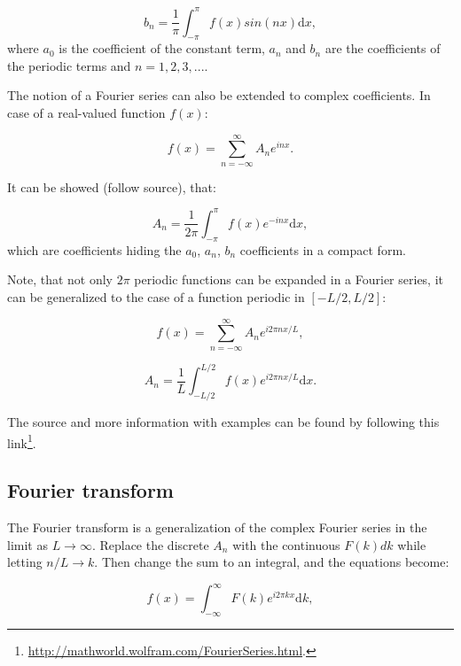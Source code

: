 \documentclass[12pt]{article}
\theoremstyle{plain}
\begin{document}
\begin{equation}
b_n = \frac{1}{\pi} \int_{-\pi}^{\pi} f(x) sin(nx) \text{d}x,
\end{equation}
where $a_0$ is the coefficient of the constant term, $a_n$ and $b_n$ are the coefficients of the periodic terms and $n=1,2,3, ...$.

The notion of a Fourier series can also be extended to complex coefficients. In case of a real-valued function $f(x)$:

\begin{equation}
f(x) = \sum_{n=-\infty}^{\infty} A_n e^{i n x}.
\end{equation}

It can be showed (follow source), that:

\begin{equation}
A_n = \frac{1}{2 \pi} \int_{-\pi}^{\pi} f(x) e^{-i n x} \text{d}x,
\end{equation}
which are coefficients hiding the $a_0$, $a_n$, $b_n$ coefficients in a compact form.

Note, that not only $2 \pi$ periodic functions can be expanded in a Fourier series, it can be generalized to the case of a function periodic in $[-L/2, L/2]$:

\begin{equation}
f(x) = \sum_{n=-\infty}^{\infty} A_n e^{i 2 \pi n x/L},
\end{equation}

\begin{equation}
A_n = \frac{1}{L} \int_{-L/2}^{L/2} f(x) e^{i 2 \pi n x/L} \text{d}x.
\end{equation}

The source and more information with examples can be found by following this link\footnote{\url{http://mathworld.wolfram.com/FourierSeries.html}.}. 

\subsection{Fourier transform}

The Fourier transform is a generalization of the complex Fourier series in the limit as $L \rightarrow	\infty$. Replace the discrete $A_n$ with the continuous $F(k)dk$ while letting  $n/L \rightarrow k$. Then change the sum to an integral, and the equations become:

\begin{equation}
f(x) = \int_{-\infty}^{\infty} F(k) e^{i 2 \pi k x} \text{d}k,
\end{equation}
\end{document}
